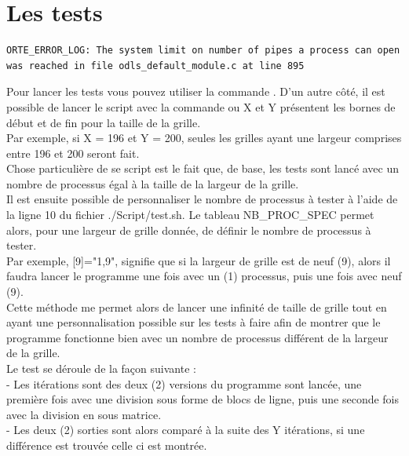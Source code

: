 \documentclass[10pt,a4paper]{article}
\begin{document}
\section{Les tests}

\begin{verbatim}
ORTE_ERROR_LOG: The system limit on number of pipes a process can open 
was reached in file odls_default_module.c at line 895
\end{verbatim}

Pour lancer les tests vous pouvez utiliser la commande . D'un autre côté, il est possible de lancer le script avec la commande   ou X et Y présentent les bornes de début et de fin pour la taille de la grille. \\
Par exemple, si X = 196 et Y = 200, seules les grilles ayant une largeur comprises entre 196 et 200 seront fait. \\

Chose particulière de se script est le fait que, de base, les tests sont lancé avec un nombre de processus égal à la taille de la largeur de la grille.\\
Il est ensuite possible de personnaliser le nombre de processus à tester à l'aide de la ligne 10 du fichier ./Script/test.sh. Le tableau NB\_PROC\_SPEC permet alors, pour une largeur de grille donnée, de définir le nombre de processus à tester.\\
Par exemple, [9]="1,9", signifie que si la largeur de grille est de neuf (9), alors il faudra lancer le programme une fois avec un (1) processus, puis une fois avec neuf (9). \\
Cette méthode me permet alors de lancer une infinité de taille de grille tout en ayant une personnalisation possible sur les tests à faire afin de montrer que le programme fonctionne bien avec un nombre de processus différent de la largeur de la grille. \\

Le test se déroule de la façon suivante : \\
\indent - Les itérations sont des deux (2) versions du programme sont lancée, une première fois avec une division sous forme de blocs de ligne, puis une seconde fois avec la division en sous matrice. \\
\indent - Les deux (2) sorties sont alors comparé à la suite des Y itérations, si une différence est trouvée celle ci est montrée.\\
\end{document}
